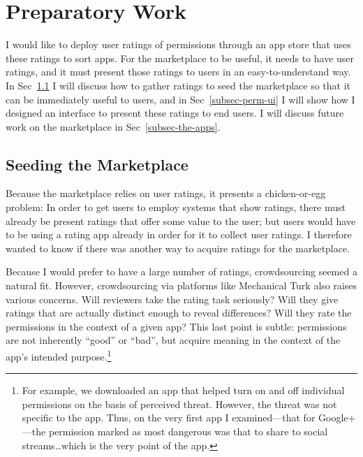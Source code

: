 \documentclass[11pt]{article}
\begin{document}

\section{Preparatory Work}
\label{sec-prep-work}

I would like to deploy user ratings of permissions
through an app store that uses these ratings to sort
apps. For the marketplace to be useful, it needs to have
user ratings, and it must present those ratings to users in
an easy-to-understand way. In Sec~\ref{subsec-seeding} I will 
discuss how to gather ratings to seed the marketplace so that 
it can be immediately useful to users, and in Sec~\ref{subsec-perm-ui}
I will show how I designed an interface to present these ratings 
to end users. I will discuss future work on the marketplace in 
Sec~\ref{subsec-the-apps}.

\subsection{Seeding the Marketplace}
\label{subsec-seeding}
Because the marketplace relies on user ratings, it presents 
a chicken-or-egg problem: In order to get users
to employ systems that show ratings, there must already be present
ratings that offer some value to the user; but users would have to be
using a rating app already in order for it to collect user
ratings. I therefore wanted to know if there was another way to
acquire ratings for the marketplace.

Because I would prefer to have a large number of ratings,
crowdsourcing seemed a natural fit. However, crowdsourcing via
platforms like Mechanical Turk also raises various concerns. Will
reviewers take the rating task seriously? Will they give ratings that
are actually distinct enough to reveal differences? Will they rate the
permissions in the context of a given app? This last point is subtle: permissions are
not inherently ``good'' or ``bad'', but acquire meaning in the context
of the app's intended purpose.\footnote{For example, we
  downloaded an app that helped turn on and off individual permissions
  on the basis of perceived threat. However, the threat was not
  specific to the app. Thus, on the very first app I examined---that
  for Google+---the permission marked as most dangerous was that to
  share to social streams\dots which is the very point of the app.}
\end{document}
